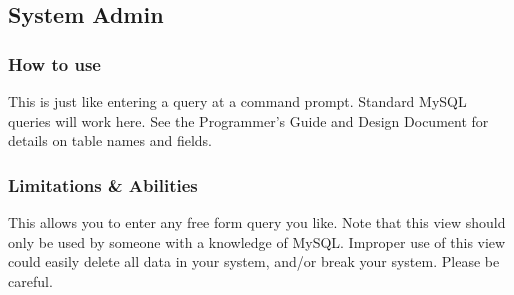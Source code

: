 \documentclass[letter]{article}
\begin{document}
\subsection{System Admin}
\subsubsection{How to use}
This is just like entering a query at a command prompt. Standard MySQL queries will work here. See the Programmer's Guide and Design Document for details on table names and fields.

\subsubsection{Limitations \& Abilities}
This allows you to enter any free form query you like. Note that this view should only be used by someone with a knowledge of MySQL. Improper use of this view could easily delete all data in your system, and/or break your system. Please be careful.


\end{document}
